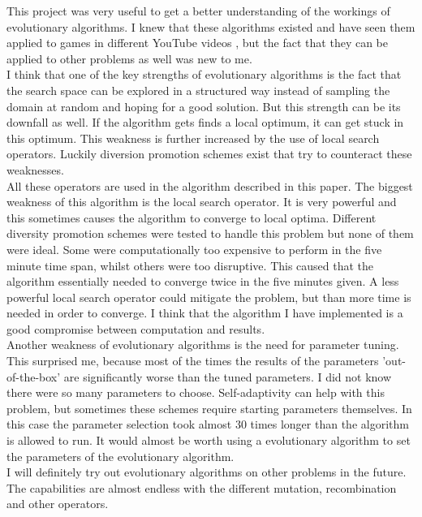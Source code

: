 \documentclass[a4paper,10pt]{article}
\newcommand{\ReplaceMe}[1]{{\color{blue}#1}}
\begin{document}
This project was very useful to get a better understanding of the workings of evolutionary algorithms. I knew that these algorithms existed and have seen them applied to games in different YouTube videos \cite{video1, video2}, but the fact that they can be applied to other problems as well was new to me. \\
I think that one of the key strengths of evolutionary algorithms is the fact that the search space can be explored in a structured way instead of sampling the domain at random and hoping for a good solution. But this strength can be its downfall as well. If the algorithm gets finds a local optimum, it can get stuck in this optimum. This weakness is further increased by the use of local search operators. Luckily diversion promotion schemes exist that try to counteract these weaknesses.\\
All these operators are used in the algorithm described in this paper. The biggest weakness of this algorithm is the local search operator. It is very powerful and this sometimes causes the algorithm to converge to local optima. Different diversity promotion schemes were tested to handle this problem but none of them were ideal. Some were computationally too expensive to perform in the five minute time span, whilst others were too disruptive. This caused that the algorithm essentially needed to converge twice in the five minutes given. A less powerful local search operator could mitigate the problem, but than more time is needed in order to converge. I think that the algorithm I have implemented is a good compromise between computation and results.\\
Another weakness of evolutionary algorithms is the need for parameter tuning.  This surprised me, because most of the times the results of the parameters 'out-of-the-box' are significantly worse than the tuned parameters. I did not know there were so many parameters to choose. Self-adaptivity can help with this problem, but sometimes these schemes require starting parameters themselves. In this case the parameter selection took almost 30 times longer than the algorithm is allowed to run. It would almost be worth using a evolutionary algorithm to set the parameters of the evolutionary algorithm.\\
I will definitely try out evolutionary algorithms on other problems in the future. The capabilities are almost endless with the different mutation, recombination and other operators. 


\newpage


\end{document}
